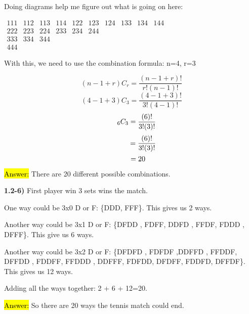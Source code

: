 \documentclass{article}
\begin{document}
\vspace{2mm}

Doing diagrams help me figure out what is going on here:

\vspace{2mm}

$\begin{matrix}
111 & 112 & 113 & 114 & 122 & 123 & 124 & 133 & 134 & 144 \\
222 & 223 & 224 & 233 & 234 & 244\\
333  & 334 & 344\\
444
\end{matrix}$
\vspace{2mm}

With this, we need to use the combination formula: n=4, r=3

$$(n-1+r)C_{r}=\frac{(n-1+r)!}{r!(n-1)!}$$
$$(4-1+3)C_{3}=\frac{(4-1+3)!}{3!(4-1)!}$$
$$\hspace{.2in}_6C_{3}=\frac{(6)!}{3!(3)!}$$
$$\hspace{.45in}=\frac{(6)!}{3!(3)!}$$
$$\hspace{.25in}=20$$

\hl{Answer:} There are 20 different possible combinations.




\newpage

\textbf{1.2-6)}  First player win 3 sets wins the match. 
\vspace{2mm}

One way could be 3x0 D or F: \{DDD, FFF\}. This gives us 2 ways.
\vspace{2mm}

Another way could be 3x1 D or F: \{DFDD , FDFF, DDFD , FFDF, FDDD , DFFF\}. This give us 6 ways.
\vspace{2mm}

Another way could be 3x2 D or F: \{DFDFD , FDFDF ,DDFFD , FFDDF, DFFDD , FDDFF, FFDDD , DDFFF, FDFDD,   DFDFF, FDDFD,  DFFDF\}. This gives us 12 ways. 
\vspace{2mm}

Adding all the ways together: 2 + 6 + 12=20. 

\vspace{2mm}
\hl{Answer:} So there are 20 ways the tennis match could end.

\newpage
\end{document}
